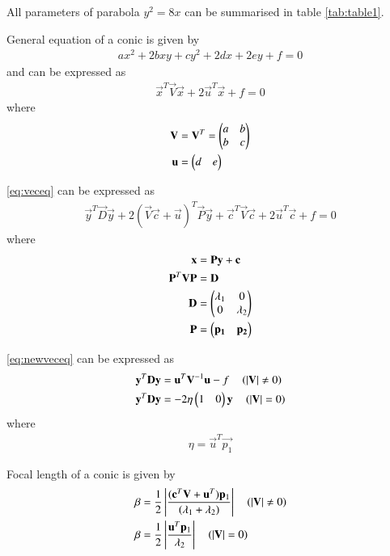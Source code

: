 \documentclass[journal,12pt,twocolumn]{IEEEtran}
\begin{document}
All parameters of parabola $y^2=8x$ can be summarised in table \ref{tab:table1}.

\begin{lemma}
General equation of a conic is given by
\begin{align}
ax^2+2bxy+cy^2+2dx+2ey+f=0 \label{eq:geneq}
\end{align}
and can be expressed as 
\begin{align}
    \vec{x}^T\vec{V}\vec{x} + 2\vec{u}^T\vec{x} + f = 0 \label{eq:veceq}
\end{align}
where
\begin{align}
    \mathbf{V}&=\mathbf{V}^T=\begin{pmatrix}a & b\\b & c\end{pmatrix}
    \\
    \mathbf{u}&=\begin{pmatrix}d & e\end{pmatrix}
\end{align}
\end{lemma}

\begin{lemma}
\eqref{eq:veceq} can be expressed as 
\begin{align}
    \vec{y}^T\vec{D}\vec{y} + 2(\vec{V}\vec{c} + \vec{u})^T \vec{P}\vec{y} + \vec{c}^T\vec{V}\vec{c} + 2\vec{u}^T\vec{c} + f = 0 \label{eq:newveceq}
\end{align}
where
\begin{align}
    \mathbf{x} &= \mathbf{P}\mathbf{y}+\mathbf{c} \\
    \mathbf{P}^T\mathbf{V}\mathbf{P} &= \mathbf{D} \\
    \mathbf{D} &= \begin{pmatrix}\lambda_1 & 0 \\ 0 & \lambda_2\end{pmatrix}\\
    \mathbf{P} &= \begin{pmatrix}\mathbf{p_1} & \mathbf{p_2}\end{pmatrix}
\end{align}
\end{lemma}

\begin{lemma}
\eqref{eq:newveceq} can be expressed as 
\begin{align}
 \mathbf{y}^T\mathbf{D}\mathbf{y} &= \mathbf{u}^T\mathbf{V}^{-1}\mathbf{u} - f \quad \left(\left\vert\mathbf{V}\right\vert \neq 0\right) \label{eq:stdvecneq}
 \\
\mathbf{y}^T\mathbf{D}\mathbf{y} &= -2\eta\begin{pmatrix}1 & 0\end{pmatrix}\mathbf{y} \quad \left(\left\vert\mathbf{V}\right\vert = 0\right) \label{eq:stdveceq}
\end{align} 
where
\begin{align}
    \eta = \vec{u}^T\vec{p_1}
\end{align}
\end{lemma}

\begin{lemma}
Focal length of a conic is given by
\begin{align}
\beta &= \frac{1}{2}\left\vert\frac{(\mathbf{c}^T\mathbf{V}+\mathbf{u}^T)\mathbf{p}_1}{(\lambda_1+\lambda_2)}\right\vert \quad \left(\left\vert\mathbf{V}\right\vert \neq 0\right) \label{eq:foclenneq}
\\
\beta &= \frac{1}{2}\left\vert\frac{\mathbf{u}^T\mathbf{p}_1}{\lambda_2}\right\vert \quad \left(\left\vert\mathbf{V}\right\vert = 0\right) \label{eq:foclen} \end{align}
\end{lemma}
\end{document}

